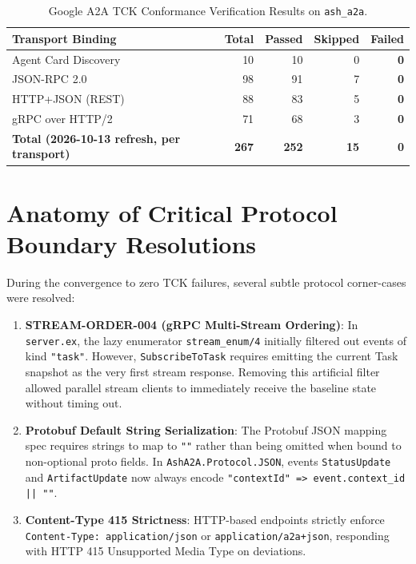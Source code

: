 \documentclass[11pt,twoside,openright]{report}
\theoremstyle{definition}
\theoremstyle{plain}
\theoremstyle{remark}
\begin{document}
\begin{table}[htbp]
\centering
\begin{tabular}{lrrrr}
\toprule
\textbf{Transport Binding} & \textbf{Total} & \textbf{Passed} & \textbf{Skipped} & \textbf{Failed} \\
\midrule
Agent Card Discovery & 10 & 10 & 0 & \textbf{0} \\
JSON-RPC 2.0 & 98 & 91 & 7 & \textbf{0} \\
HTTP+JSON (REST) & 88 & 83 & 5 & \textbf{0} \\
gRPC over HTTP/2 & 71 & 68 & 3 & \textbf{0} \\
\midrule
\textbf{Total (2026-10-13 refresh, per transport)} & \textbf{267} & \textbf{252} & \textbf{15} & \textbf{0} \\
\bottomrule
\end{tabular}
\caption{Google A2A TCK Conformance Verification Results on \texttt{ash\_a2a}.}
\label{tab:tck_results}
\end{table}

\section{Anatomy of Critical Protocol Boundary Resolutions}
During the convergence to zero TCK failures, several subtle protocol corner-cases were resolved:
\begin{enumerate}
    \item \textbf{STREAM-ORDER-004 (gRPC Multi-Stream Ordering)}: In \texttt{server.ex}, the lazy enumerator \texttt{stream\_enum/4} initially filtered out events of kind \texttt{"task"}. However, \texttt{SubscribeToTask} requires emitting the current Task snapshot as the very first stream response. Removing this artificial filter allowed parallel stream clients to immediately receive the baseline state without timing out.
    \item \textbf{Protobuf Default String Serialization}: The Protobuf JSON mapping spec requires strings to map to \texttt{""} rather than being omitted when bound to non-optional proto fields. In \texttt{AshA2A.Protocol.JSON}, events \texttt{StatusUpdate} and \texttt{ArtifactUpdate} now always encode \texttt{"contextId" => event.context\_id || ""}.
    \item \textbf{Content-Type 415 Strictness}: HTTP-based endpoints strictly enforce \texttt{Content-Type: application/json} or \texttt{application/a2a+json}, responding with HTTP 415 Unsupported Media Type on deviations.
\end{enumerate}
\end{document}
